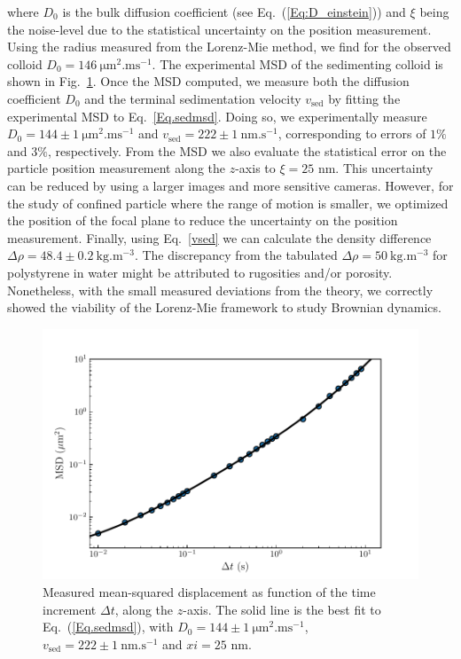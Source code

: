 where $D_0$ is the bulk diffusion coefficient (see Eq.~(\ref{Eq:D_einstein})) and $\xi$ being the noise-level due to the statistical uncertainty on the position measurement. Using the radius measured from the Lorenz-Mie method, we find for the observed colloid $D_0 = 146 ~\mathrm{\mu m ^2 . ms^{-1}}$. The experimental \gls{MSD} of the sedimenting colloid is shown in Fig.~\ref{fig:msdsed}. Once the \gls{MSD} computed, we measure both the diffusion coefficient $D_0$ and the terminal sedimentation velocity $v_\mathrm{sed}$ by fitting the experimental \gls{MSD} to Eq.~\ref{Eq.sedmsd}. Doing so, we experimentally measure $D_0 = 144 \pm 1 ~ \mathrm{\mu m ^2 . ms^{-1}}$ and $v_\mathrm{sed} = 222 \pm 1 ~ \mathrm{nm.s^{-1}}$, corresponding to errors of $1\%$ and $3\%$, respectively. From the MSD we also evaluate the statistical error on the particle position measurement along the $z$-axis to $\xi = 25$ nm. This uncertainty can be reduced by using a larger images and more sensitive cameras. However, for the study of confined particle where the range of motion is smaller, we optimized the position of the focal plane to reduce the uncertainty on the position measurement. Finally, using Eq.~\ref{vsed} we can calculate the density difference $\Delta \rho = 48.4 \pm 0.2~ \mathrm{kg.m^{-3}}$. The discrepancy from the tabulated $\Delta \rho = 50~ \mathrm{kg.m^{-3}}$ for polystyrene in water might be attributed to rugosities and/or porosity. Nonetheless, with the small measured deviations from the theory, we correctly showed the viability of the Lorenz-Mie framework to study Brownian dynamics.  

\begin{figure}[H]
	\centering
	\includegraphics{02_body/chapter2/images/sedimenting/msd_sedimentation.pdf}
	\caption{Measured mean-squared displacement as function of the time increment $\Delta t$, along the $z$-axis. The solid line is the best fit to Eq.~(\ref{Eq.sedmsd}), with $D_0 = 144 \pm 1 ~ \mathrm{\mu m ^2 . ms^{-1}}$, $v_\mathrm{sed} = 222 \pm 1 ~ \mathrm{nm.s^{-1}}$ and $xi = 25 $ nm.}
	\label{fig:msdsed}
\end{figure}



